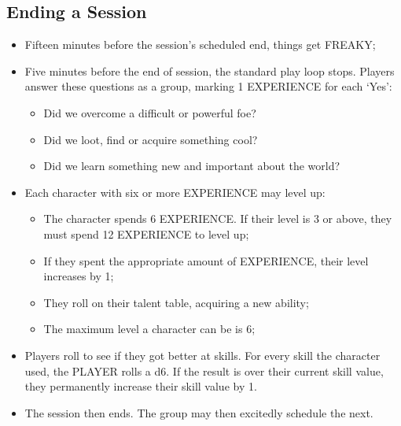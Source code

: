 \subsection{Ending a Session}
\begin{itemize}
    \item {Fifteen minutes before the session's scheduled end, things get FREAKY;}
    \item {Five minutes before the end of session, the standard play loop stops. Players answer these questions as a group, marking 1 EXPERIENCE for each `Yes':}
    \begin{itemize}
        \item {Did we overcome a difficult or powerful foe?}
        \item {Did we loot, find or acquire something cool?}
        \item {Did we learn something new and important about the world?}
    \end{itemize}
    \item {Each character with six or more EXPERIENCE may level up:}
    \begin{itemize}
        \item {The character spends 6 EXPERIENCE. If their level is 3 or above, they must spend 12 EXPERIENCE to level up;}
        \item {If they spent the appropriate amount of EXPERIENCE, their level increases by 1;}
        \item {They roll on their talent table, acquiring a new ability;}
        \item {The maximum level a character can be is 6;}
    \end{itemize}
    \item {Players roll to see if they got better at skills. For every skill the character used, the PLAYER rolls a d6. If the result is over their current skill value, they permanently increase their skill value by 1.}
    \item {The session then ends. The group may then excitedly schedule the next.}
\end{itemize}

